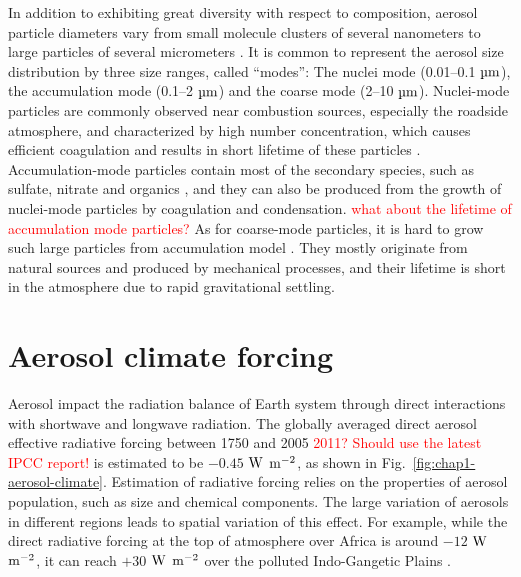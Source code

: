 \documentclass[edeposit,fullpage]{uiucthesis2009}
\begin{document}

In addition to exhibiting great diversity with respect to composition,
aerosol particle diameters vary from small molecule clusters of
several nanometers to large particles of several micrometers
\citep{MCMURRY200320}. It is common to represent the aerosol size
distribution by three size ranges, called ``modes'': The nuclei mode
(0.01--0.1 $\rm \mu m$), the accumulation mode (0.1--2 $\rm \mu m$)
and the coarse mode (2--10 $ \rm \mu m$). Nuclei-mode particles are
commonly observed near combustion sources, especially the roadside
atmosphere, and characterized by high number concentration, which
causes efficient coagulation and results in short lifetime of these
particles \citep{fushimi2008atmospheric}. Accumulation-mode particles
contain most of the secondary species, such as sulfate, nitrate and
organics \citep{zhang2005time}, and they can also be produced from the
growth of nuclei-mode particles by coagulation and
condensation. \textcolor{red}{what about the lifetime of accumulation
  mode particles?} As for coarse-mode particles, it is hard to grow
such large particles from accumulation model
\citep{friedlander1991scavenging, lee2005size}. They mostly originate
from natural sources and produced by mechanical processes, and their
lifetime is short in the atmosphere due to rapid gravitational
settling.

\section{Aerosol climate forcing}
\label{cha1-2:aerosl-climate}
Aerosol impact the radiation balance of Earth system through direct
interactions with shortwave and longwave radiation. The globally
averaged direct aerosol effective radiative forcing between 1750 and
2005 \textcolor{red}{2011?} \textcolor{red}{Should use the latest IPCC
  report!} is estimated to be $-0.45$ $\rm W$ $\rm m^{-2}$, as shown
in Fig.~\ref{fig:chap1-aerosol-climate}. Estimation of radiative
forcing relies on the properties of aerosol population, such as size
and chemical components. The large variation of aerosols in different
regions leads to spatial variation of this effect. For example, while
the direct radiative forcing at the top of atmosphere over Africa is
around $-12$ $\rm W$ $\rm m^{-2}$, it can reach $+30$ $\rm W$ $\rm
m^{-2}$ over the polluted Indo-Gangetic Plains
\citep{subba2020recent}.
\end{document}
